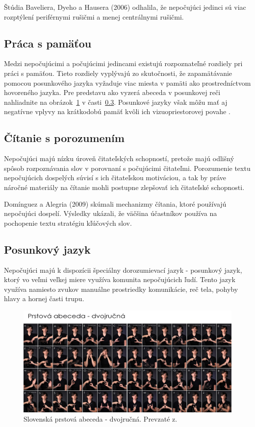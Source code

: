 \documentclass[10pt,oneside,slovak,a4paper]{article}
\begin{document}
Štúdia Baveliera, Dyeho a Hausera (2006) odhalila, že nepočujúci jedinci sú viac rozptýlení periférnymi rušičmi a menej centrálnymi rušičmi. \cite{bavelier2006deaf} 

\subsection{Práca s pamäťou} \label{rozdiely:pamat}
Medzi nepočujúcimi a počujúcimi jedincami existujú rozpoznateľné rozdiely pri práci s pamäťou. Tieto rozdiely vyplývajú zo skutočnosti, že zapamätávanie pomocou posunkového jazyka vyžaduje viac miesta v pamäti ako prostredníctvom hovoreného jazyka. Pre predstavu ako vyzerá abeceda v posunkovej reči nahliadnite na obrázok~\ref{slovenskaposunkovarec} v časti~\ref{rozdiely:posunkovyjazyk}. Posunkové jazyky však môžu mať aj negatívne vplyvy na krátkodobú pamäť kvôli ich vizuopriestorovej povahe
\cite{pappas2018learning}.

\subsection{Čítanie s porozumením} \label{rozdiely:citanie}
Nepočujúci majú nízku úroveň čitateľských schopností, pretože majú odlišný spôsob rozpoznávania slov v porovnaní s počujúcimi čitateľmi. Porozumenie textu nepočujúcich dospelých súvisí s ich čitateľskou motiváciou, a tak by práve náročné materiály na čítanie mohli postupne zlepšovať ich čitateľské schopnosti\cite{pappas2018learning}.

Domínguez a Alegria (2009) skúmali mechanizmy čítania, ktoré používajú nepočujúci dospelí. Výsledky ukázali, že väčšina účastníkov používa na pochopenie textu stratégiu kľúčových slov\cite{dominguez2010reading}. 

\subsection{Posunkový jazyk}
\label{rozdiely:posunkovyjazyk}
Nepočujúci majú k dispozícii špeciálny dorozumievací jazyk - posunkový jazyk, ktorý vo veľmi veľkej miere využíva komunita nepočujúcich ľudí. Tento jazyk využíva namiesto zvukov manuálne prostriedky komunikácie, reč tela, pohyby hlavy a hornej časti trupu.
\begin{figure}[H]
   \includegraphics[scale=0.15]{dvojrucnaabeceda.jpg}
\centering
\caption{Slovenská prstová abeceda - dvojručná. Prevzaté z\cite{mytyafakty}.}

\label{slovenskaposunkovarec}
\end{figure}
\end{document}
